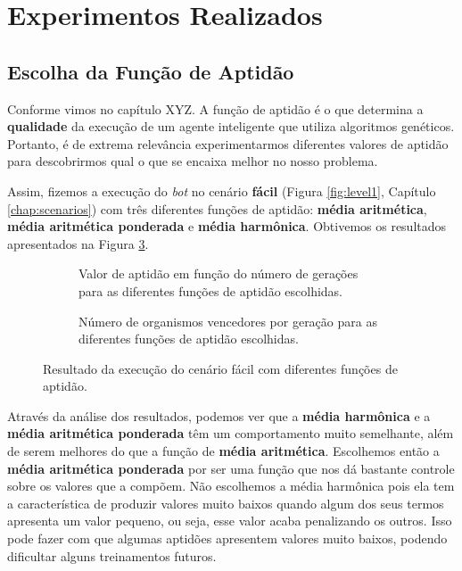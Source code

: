 \section{\label{section:experiments}Experimentos Realizados}

\subsection{Escolha da Função de Aptidão}


Conforme vimos no capítulo XYZ. A função de aptidão é o que determina a
\textbf{qualidade} da execução de um agente inteligente que utiliza algoritmos
genéticos. Portanto, é de extrema relevância experimentarmos diferentes valores
de aptidão para descobrirmos qual o que se encaixa melhor no nosso problema.

Assim, fizemos a execução do \textit{bot} no cenário \textbf{fácil} (Figura
\ref{fig:level1}, Capítulo \ref{chap:scenarios}) com três diferentes funções de
aptidão: \textbf{média aritmética}, \textbf{média aritmética ponderada} e
\textbf{média harmônica}. Obtivemos os resultados apresentados na Figura
\ref{fig:fitness-experiment}.

\begin{figure}[H]
\centering
	\begin{subfigure}[b]{0.4\textwidth}
        \caption{Valor de aptidão em função do número de gerações para as
        diferentes funções de aptidão escolhidas.}
		\label{fig:tbd1}
	\end{subfigure}
	\begin{subfigure}[b]{0.4\textwidth}
        \caption{Número de organismos vencedores por geração para as diferentes
        funções de aptidão escolhidas.}
		\label{fig:tbd1}
	\end{subfigure}

    \caption{Resultado da execução do cenário fácil com diferentes funções de
    aptidão.}
	\label{fig:fitness-experiment}
\end{figure}

Através da análise dos resultados, podemos ver que a \textbf{média harmônica} e
a \textbf{média aritmética ponderada} têm um comportamento muito semelhante,
além de serem melhores do que a função de \textbf{média aritmética}. Escolhemos
então a \textbf{média aritmética ponderada} por ser uma função que nos dá
bastante controle sobre os valores que a compõem. Não escolhemos a média
harmônica pois ela tem a característica de produzir valores muito baixos quando
algum dos seus termos apresenta um valor pequeno, ou seja, esse valor acaba
penalizando os outros. Isso pode fazer com que algumas aptidões apresentem
valores muito baixos, podendo dificultar alguns treinamentos futuros.

